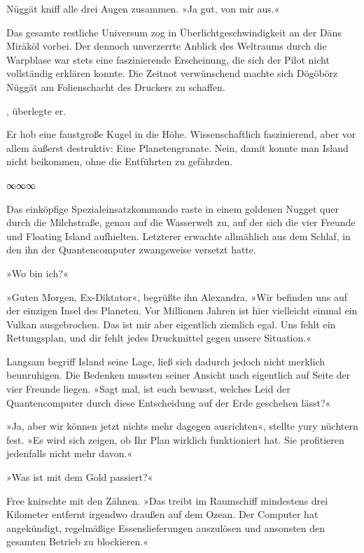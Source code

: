 Nüggät kniff alle drei Augen zusammen. »Ja gut, von mir aus.«

Das gesamte restliche Universum zog in Überlichtgeschwindigkeit an der Däns Miräköl vorbei. Der dennoch unverzerrte Anblick des Weltraums durch die Warpblase war stets eine faszinierende Erscheinung, die sich der Pilot nicht vollständig erklären konnte. Die Zeitnot verwünschend machte sich Dögöbörz Nüggät am Folienschacht des Druckers zu schaffen.

, überlegte er. 

Er hob eine faustgroße Kugel in die Höhe. Wissenschaftlich faszinierend, aber vor allem äußerst destruktiv: Eine Planetengranate. Nein, damit konnte man Island nicht beikommen, ohne die Entführten zu gefährden.

\begin{center}
∞∞∞
\end{center}

Das einköpfige Spezialeinsatzkommando raste in einem goldenen Nugget quer durch die Milchstraße, genau auf die Wasserwelt zu, auf der sich die vier Freunde und Floating Island aufhielten. Letzterer erwachte allmählich aus dem Schlaf, in den ihn der Quantencomputer zwangsweise versetzt hatte.

»Wo bin ich?«

»Guten Morgen, Ex-Diktator«, begrüßte ihn Alexandra. »Wir befinden uns auf der einzigen Insel des Planeten. Vor Millionen Jahren ist hier vielleicht einmal ein Vulkan ausgebrochen. Das ist mir aber eigentlich ziemlich egal. Uns fehlt ein Rettungsplan, und dir fehlt jedes Druckmittel gegen unsere Situation.«

Langsam begriff Island seine Lage, ließ sich dadurch jedoch nicht merklich beunruhigen. Die Bedenken mussten seiner Ansicht nach eigentlich auf Seite der vier Freunde liegen. »Sagt mal, ist euch bewusst, welches Leid der Quantencomputer durch diese Entscheidung auf der Erde geschehen lässt?«

»Ja, aber wir können jetzt nichts mehr dagegen ausrichten«, stellte yury nüchtern fest. »Es wird sich zeigen, ob Ihr Plan wirklich funktioniert hat. Sie profitieren jedenfalls nicht mehr davon.«

»Was ist mit dem Gold passiert?«

Free knirschte mit den Zähnen. »Das treibt im Raumschiff mindestens drei Kilometer entfernt irgendwo draußen auf dem Ozean. Der Computer hat angekündigt, regelmäßige Essenslieferungen auszulösen und ansonsten den gesamten Betrieb zu blockieren.«

